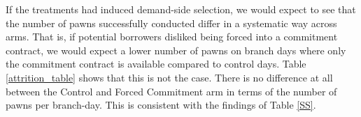 \documentclass[11pt, a4paper]{article}
\begin{document}
If the treatments had induced demand-side selection, we would expect to see that the number of pawns successfully conducted differ in a systematic way across arms. That is, if potential borrowers disliked being forced into a commitment contract, we would expect a lower number of pawns on branch days where only the commitment contract is available compared to control days. Table \ref{attrition_table} shows that this is not the case. There is no difference at all between the Control and Forced Commitment arm in terms of the number of pawns per branch-day. %
This is consistent with the findings of Table \ref{SS}.
\end{document}
